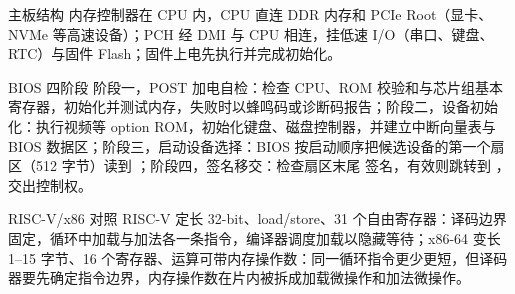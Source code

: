 \begin{chapteranswer}{主板结构}
内存控制器在 CPU 内，CPU 直连 DDR 内存和 PCIe Root（显卡、NVMe 等高速设备）；PCH 经 DMI 与 CPU 相连，挂低速 I/O（串口、键盘、RTC）与固件 Flash；固件上电先执行并完成初始化。
\end{chapteranswer}

\begin{chapteranswer}{BIOS 四阶段}
阶段一，POST 加电自检：检查 CPU、ROM 校验和与芯片组基本寄存器，初始化并测试内存，失败时以蜂鸣码或诊断码报告；阶段二，设备初始化：执行视频等 option ROM，初始化键盘、磁盘控制器，并建立中断向量表与 BIOS 数据区；阶段三，启动设备选择：BIOS 按启动顺序把候选设备的第一个扇区（512 字节）读到 ；阶段四，签名移交：检查扇区末尾  签名，有效则跳转到 ，交出控制权。
\end{chapteranswer}

\begin{chapteranswer}{RISC-V/x86 对照}
RISC-V 定长 32-bit、load/store、31 个自由寄存器：译码边界固定，循环中加载与加法各一条指令，编译器调度加载以隐藏等待；x86-64 变长 1--15 字节、16 个寄存器、运算可带内存操作数：同一循环指令更少更短，但译码器要先确定指令边界，内存操作数在片内被拆成加载微操作和加法微操作。
\end{chapteranswer}
